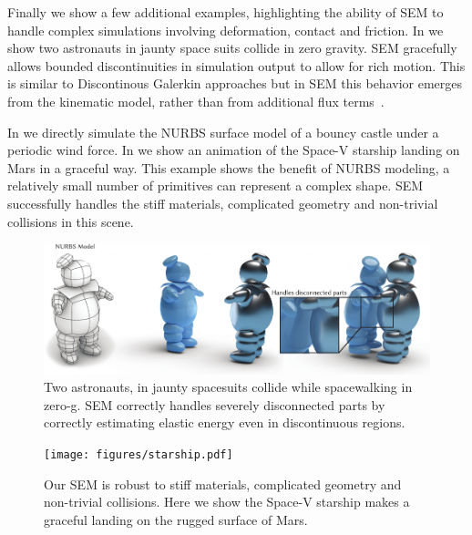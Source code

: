 Finally we show a few additional examples, highlighting the ability of SEM to handle complex simulations involving deformation, contact and friction.
In  we show two astronauts in jaunty space suits collide in zero gravity. 
SEM gracefully allows bounded discontinuities in simulation output to allow for rich motion. 
This is similar to Discontinous Galerkin approaches but in SEM this behavior emerges from the kinematic model, rather than from additional flux terms~\cite{kaufmann2009flexible}.

In  we directly simulate the NURBS surface model of a bouncy castle under a periodic wind force. 
In  we show an animation of the Space-V starship landing on Mars in a graceful way. 
This example shows the benefit of NURBS modeling, a relatively small number of primitives can represent a complex shape.
SEM successfully handles the stiff materials, complicated geometry and non-trivial collisions in this scene.

\begin{figure}[htp]
  \includegraphics[width=\textwidth]{figures/astronauts.pdf}
  \caption{Two astronauts, in jaunty spacesuits collide while spacewalking in zero-g. SEM correctly handles severely disconnected parts by correctly estimating elastic energy even in discontinuous regions.}
  \label{fig:staypuft}
\end{figure}

\begin{figure}[htp]
  \texttt{[image: figures/starship.pdf]}
  \caption{Our SEM is robust to stiff materials, complicated geometry and non-trivial collisions. Here we show the Space-V starship makes a graceful landing on the rugged surface of Mars. }
  \label{fig:starship}
\end{figure}
